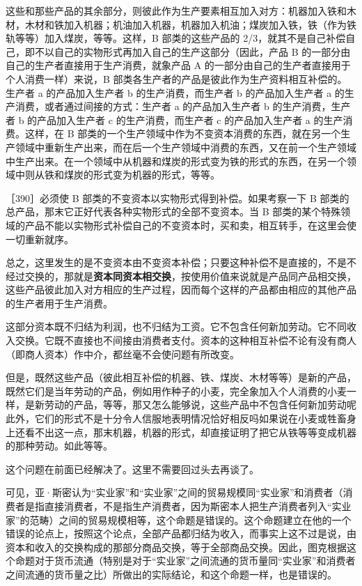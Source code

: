 这些和那些产品的其余部分，则彼此作为生产要素相互加入对方：机器加入铁和木材，木材和铁加入机器；机油加入机器，机器加入机油；煤炭加入铁，铁（作为铁轨等等）加入煤炭，等等。这样，B 部类的这些产品的 2/3，就其不是自己补偿自己，即不以自己的实物形式再加入自己的生产这部分（因此，产品 B 的一部分由自己的生产者直接用于生产消费，就象产品 A 的一部分由自己的生产者直接用于个人消费一样）来说，B 部类各生产者的产品是彼此作为生产资料相互补偿的。生产者 a 的产品加入生产者 b 的生产消费，而生产者 b 的产品加入生产者 a 的生产消费，或者通过间接的方式：生产者 a 的产品加入生产者 b 的生产消费，生产者 b 的产品加入生产者 c 的生产消费，而生产者 c 的产品加入生产者 a 的生产消费。这样，在 B 部类的一个生产领域中作为不变资本消费的东西，就在另一个生产领域中重新生产出来，而在后一个生产领域中消费的东西，又在前一个生产领域中生产出来。在一个领域中从机器和煤炭的形式变为铁的形式的东西，在另一个领域中则从铁和煤炭的形式变为机器的形式，等等。

［390］必须使 B 部类的不变资本以实物形式得到补偿。如果考察一下 B 部类的总产品，那末它正好代表各种实物形式的全部不变资本。当 B 部类的某个特殊领域的产品不能以实物形式补偿自己的不变资本时，买和卖，相互转手，在这里会使一切重新就序。

总之，这里发生的是不变资本由不变资本补偿；只要这种补偿不是直接的，不是不经过交换的，那就是\textbf{资本同资本相交换}，按使用价值来说就是产品同产品相交换，这些产品彼此加入对方相应的生产过程，因而每个这样的产品都由相应的其他产品的生产者用于生产消费。

这部分资本既不归结为利润，也不归结为工资。它不包含任何新加劳动。它不同收入交换。它既不直接也不间接由消费者支付。资本的这种相互补偿不论有没有商人（即商人资本）作中介，都丝毫不会使问题有所改变。

但是，既然这些产品（彼此相互补偿的机器、铁、煤炭、木材等等）是新的产品，既然它们是当年劳动的产品，例如用作种子的小麦，完全象加入个人消费的小麦一样，是新劳动的产品，等等，那又怎么能够说，这些产品中不包含任何新加劳动呢此外，它们的形式不是十分令人信服地表明情况恰好相反吗如果说在小麦或牲畜身上还看不出这一点，那末机器，机器的形式，却直接证明了把它从铁等等变成机器的那种劳动。如此等等。

这个问题在前面已经解决了。这里不需要回过头去再谈了。

\fontbox{~\{}可见，亚·斯密认为“实业家”和“实业家”之间的贸易规模同“实业家”和消费者（消费者是指直接消费者，不是指生产消费者，因为斯密本人把生产消费者列入“实业家”的范畴）之间的贸易规模相等，这个命题是错误的。这个命题建立在他的一个错误的论点上，按照这个论点，全部产品都归结为收入，而事实上这不过是说，由资本和收入的交换构成的那部分商品交换，等于全部商品交换。因此，图克根据这个命题对于货币流通（特别是对于“实业家”之间流通的货币量同“实业家”和消费者之间流通的货币量之比）所做出的实际结论，和这个命题一样，也是错误的。

